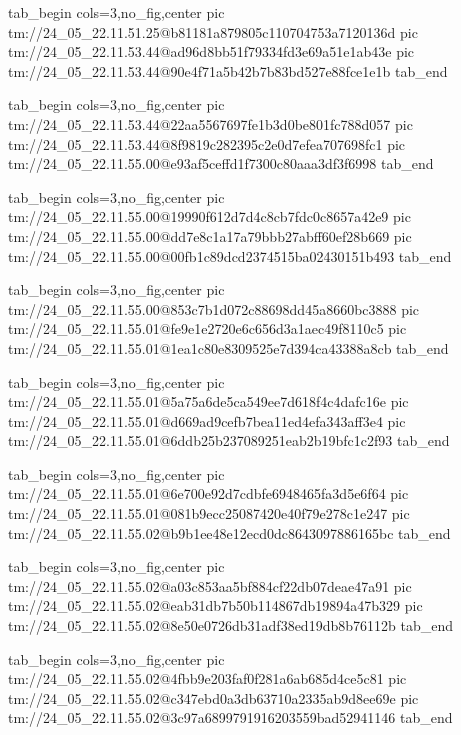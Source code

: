  
 
 
 
 

\qqSecCmtScr


\ifcmt
  tab_begin cols=3,no_fig,center
 pic tm://24_05_22.11.51.25@b81181a879805c110704753a7120136d
 pic tm://24_05_22.11.53.44@ad96d8bb51f79334fd3e69a51e1ab43e
 pic tm://24_05_22.11.53.44@90e4f71a5b42b7b83bd527e88fce1e1b
  tab_end
\fi


\ifcmt
  tab_begin cols=3,no_fig,center
 pic tm://24_05_22.11.53.44@22aa5567697fe1b3d0be801fc788d057
 pic tm://24_05_22.11.53.44@8f9819c282395c2e0d7efea707698fc1
 pic tm://24_05_22.11.55.00@e93af5ceffd1f7300c80aaa3df3f6998
  tab_end
\fi


\ifcmt
  tab_begin cols=3,no_fig,center
 pic tm://24_05_22.11.55.00@19990f612d7d4c8cb7fdc0c8657a42e9
 pic tm://24_05_22.11.55.00@dd7e8c1a17a79bbb27abff60ef28b669
 pic tm://24_05_22.11.55.00@00fb1c89dcd2374515ba02430151b493
  tab_end
\fi


\ifcmt
  tab_begin cols=3,no_fig,center
 pic tm://24_05_22.11.55.00@853c7b1d072c88698dd45a8660bc3888
 pic tm://24_05_22.11.55.01@fe9e1e2720e6c656d3a1aec49f8110c5
 pic tm://24_05_22.11.55.01@1ea1c80e8309525e7d394ca43388a8cb
  tab_end
\fi


\ifcmt
  tab_begin cols=3,no_fig,center
 pic tm://24_05_22.11.55.01@5a75a6de5ca549ee7d618f4c4dafc16e
 pic tm://24_05_22.11.55.01@d669ad9cefb7bea11ed4efa343aff3e4
 pic tm://24_05_22.11.55.01@6ddb25b237089251eab2b19bfc1c2f93
  tab_end
\fi


\ifcmt
  tab_begin cols=3,no_fig,center
 pic tm://24_05_22.11.55.01@6e700e92d7cdbfe6948465fa3d5e6f64
 pic tm://24_05_22.11.55.01@081b9ecc25087420e40f79e278c1e247
 pic tm://24_05_22.11.55.02@b9b1ee48e12ecd0dc8643097886165bc
  tab_end
\fi


\ifcmt
  tab_begin cols=3,no_fig,center
 pic tm://24_05_22.11.55.02@a03c853aa5bf884cf22db07deae47a91
 pic tm://24_05_22.11.55.02@eab31db7b50b114867db19894a47b329
 pic tm://24_05_22.11.55.02@8e50e0726db31adf38ed19db8b76112b
  tab_end
\fi


\ifcmt
  tab_begin cols=3,no_fig,center
 pic tm://24_05_22.11.55.02@4fbb9e203faf0f281a6ab685d4ce5c81
 pic tm://24_05_22.11.55.02@c347ebd0a3db63710a2335ab9d8ee69e
 pic tm://24_05_22.11.55.02@3c97a6899791916203559bad52941146
  tab_end
\fi

